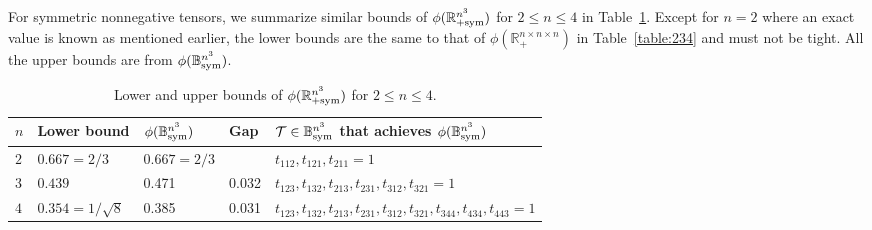\documentclass[11pt]{article}
\newcommand{\BB}{\mathbb{B}}
\newcommand{\R}{\mathbb{R}}
\newcommand{\TT}{\mathcal{T}}
\newcommand{\sym}{\textnormal{sym}}
\begin{document}
For symmetric nonnegative tensors, we summarize similar bounds of $\phi(\R^{n^3}_{+\sym})$ for $2\le n\le 4$ in Table~\ref{table:sym234}. Except for $n=2$ where an exact value is known as mentioned earlier, the lower bounds are the same to that of $\phi(\R^{n\times n\times n}_+)$ in Table~\ref{table:234} and must not be tight. All the upper bounds are from $\phi(\BB^{n^3}_\sym)$.
\begin{table}[ht]
    \centering
    \begin{tabular}{|l|l|l|l|l|}
\hline
$n$ & Lower bound & $\phi(\BB^{n^3}_\sym)$ & Gap & $\TT\in\BB^{n^3}_\sym$ that achieves $\phi(\BB^{n^3}_\sym)$ \\
\hline
$2$ & $0.667=2/3$ & $0.667=2/3$ &  & $t_{112}, t_{121}, t_{211}=1$ \\
$3$ & $0.439$ & 0.471  & 0.032 & $t_{123},t_{132},t_{213},t_{231},t_{312},t_{321}=1$ \\
$4$ & $0.354=1/\sqrt{8}$ & 0.385 & 0.031 &  $t_{123},t_{132},t_{213},t_{231},t_{312},t_{321},t_{344},t_{434},t_{443}=1$  \\
\hline
\end{tabular}
\caption{Lower and upper bounds of $\phi(\R^{n^3}_{+\sym})$ for $2\le n \le 4$.} \label{table:sym234}
\end{table}
\end{document}
